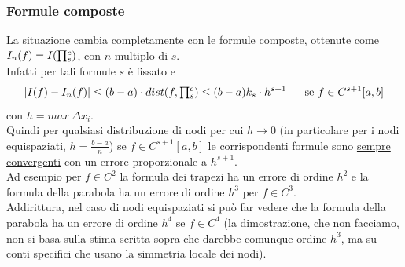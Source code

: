 \subsubsection{Formule composte}
La situazione cambia completamente con le formule composte, ottenute come $I_n(f)=I(\begin{matrix}\prod\end{matrix}_s^c)$, con $n$ multiplo di $s$.\\Infatti per tali formule $s$ è fissato e
\begin{equation*}
\begin{split}
    |I(f)-I_n(f)|\leq(b-a)\cdot dist(f,\begin{matrix}\prod\end{matrix}_s^c)\leq(b-a)k_s\cdot h^{s+1} \  \  \  \  \  \text{se} \ f\in C^{s+1}[a,b]
\end{split}
\end{equation*}
con $h = max \ \Delta x_i$.\\
Quindi per qualsiasi distribuzione di nodi per cui $h\rightarrow0$ (in particolare per i nodi equispaziati, $h=\frac{b-a}{n}$) se $f\in C^{s+1}[a,b]$ le corrispondenti formule sono \uline{sempre convergenti} con un errore proporzionale a $h^{s+1}$.\\Ad esempio per $f\in C^2$ la formula dei trapezi ha un errore di ordine $h^2$ e la formula della parabola ha un errore di ordine $h^3$ per $f\in C^3$.\\
Addirittura, nel caso di nodi equispaziati si può far vedere che la formula della parabola ha un errore di ordine $h^4$ se $f\in C^4$ (la dimostrazione, che non facciamo, non si basa sulla stima scritta sopra che darebbe comunque ordine $h^3$, ma su conti specifici che usano la simmetria locale dei nodi).

